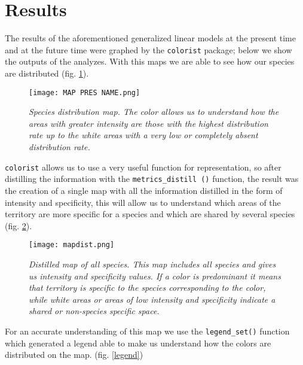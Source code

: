 \documentclass[12pt,a4paper]{article}
\begin{document}
\section{Results}
The results of the aforementioned generalized linear models at the present time and at the future time were graphed by the \texttt{colorist} package; below we show the outputs of the analyzes.
With this maps we are able to see how our species are distributed (fig. \ref{multiplepres}).
{\begin{figure}[H]
\centerline{\texttt{[image: MAP PRES NAME.png]}}
\caption{\textit{Species distribution map.
The color allows us to understand how the areas with greater intensity are those with the highest distribution rate up to the white areas with a very low or completely absent distribution rate.}}
\label{multiplepres}
\end{figure}} 
\texttt{colorist} allows us to use a very useful function for representation, so after distilling the information with the \texttt {metrics\_distill ()} function, the result was the creation of a single map with all the information distilled in the form of intensity and specificity, this will allow us to understand which areas of the territory are more specific for a species and which are shared by several species (fig. \ref{mapdist}).
\begin{figure}[H]
\centerline{\texttt{[image: mapdist.png]}}
\caption{\textit{Distilled map of all species.
This map includes all species and gives us intensity and specificity values.
If a color is predominant it means that territory is specific to the species corresponding to the color, while white areas or areas of low intensity and specificity indicate a shared or non-species specific space.}}
\label{mapdist}
\end{figure}

\vspace{1cm}
For an accurate understanding of this map we use the \texttt{legend\_set()} function which generated a legend able to make us understand how the colors are distributed on the map. (fig. \ref{legend})
\end{document}
